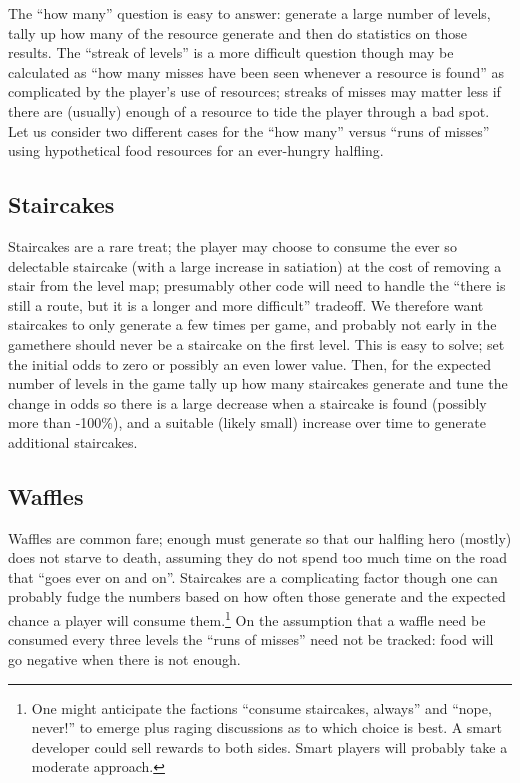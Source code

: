 \documentclass[12pt,a4paper]{article}
\begin{document}
The ``how many'' question is easy to answer: generate a large number of
levels, tally up how many of the resource generate and then do
statistics on those results. The ``streak of levels'' is a more
difficult question though may be calculated as ``how many misses have
been seen whenever a resource is found'' as complicated by the player's
use of resources; streaks of misses may matter less if there are
(usually) enough of a resource to tide the player through a bad spot.
Let us consider two different cases for the ``how many'' versus ``runs
of misses'' using hypothetical food resources for an ever-hungry halfling.

\subsection*{Staircakes}

Staircakes are a rare treat; the player may choose to consume the ever
so delectable staircake (with a large increase in satiation) at the cost
of removing a stair from the level map; presumably other code will need
to handle the ``there is still a route, but it is a longer and more
difficult'' tradeoff. We therefore want staircakes to only generate a
few times per game, and probably not early in the game\textendash there
should never be a staircake on the first level. This is easy to solve;
set the initial odds to zero or possibly an even lower value. Then, for
the expected number of levels in the game tally up how many staircakes
generate and tune the change in odds so there is a large decrease when a
staircake is found (possibly more than -100\%), and a suitable (likely
small) increase over time to generate additional staircakes.

\subsection*{Waffles}

Waffles are common fare; enough must generate so that our halfling hero
(mostly) does not starve to death, assuming they do not spend too much
time on the road that ``goes ever on and on''. Staircakes are a
complicating factor though one can probably fudge the numbers based on
how often those generate and the expected chance a player will consume
them.\footnote{One might anticipate the factions ``consume staircakes,
always'' and ``nope, never!'' to emerge plus raging discussions as to
which choice is best. A smart developer could sell rewards to both
sides. Smart players will probably take a moderate approach.} On the
assumption that a waffle need be consumed every three levels the ``runs
of misses'' need not be tracked: food will go negative when there is
not enough.
\end{document}
